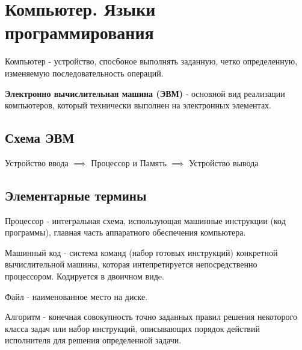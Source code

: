 
\section{Компьютер. Языки программирования}

\begin{definition}
  Компьютер - устройство, спосбоное выполнять заданную, четко определенную, изменяемую последовательность операций.
\end{definition}

\begin{definition}
  \textbf{Электронно вычислительная машина (ЭВМ)} - основной вид реализации компьютеров, который технически выполнен на электронных элементах.
\end{definition}

\subsection{Схема ЭВМ}

Устройство ввода $\implies$ Процессор и Память $\implies$ Устройство вывода

\subsection{Элементарные термины}

\begin{definition}
  Процессор - интегральная схема, использующая машинные инструкции (код программы), главная часть аппаратного обеспечения компьютера.
\end{definition}

\begin{definition}
  Машинный код - система команд (набор готовых инструкций) конкретной вычислительной машины, которая интепретируется непосредственно процессором. Кодируется в двоичном видe.
\end{definition}

\begin{definition}
  Файл - наименованное место на диске.
\end{definition}

\begin{definition}
  Алгоритм - конечная совокупность точно заданных правил решения некоторого класса задач или набор инструкций, описывающих порядок действий исполнителя для решения определенной задачи.
\end{definition}

